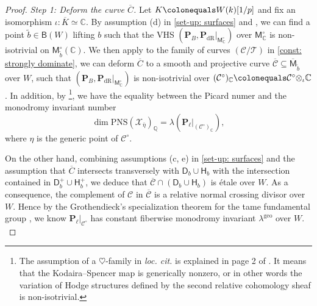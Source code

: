 \documentclass[11pt, letterpaper]{amsart}
\theoremstyle{plain}
\theoremstyle{definition}
\newcommand{\IC}{\mathbb{C}}
\newcommand{\IQ}{\mathbb{Q}}
\newcommand{\sC}{\mathcal{C}}
\newcommand\tensor{{\otimes}}
\newcommand{\<}{\langle}
\renewcommand{\>}{\rangle}
\def\wt{\widetilde}
\newcommand{\sfD}{\mathsf{D}}
\newcommand{\sfM}{\mathsf{M}}
\newcommand{\sX}{\mathcal{X}}
\newcommand{\sT}{\mathcal{T}}
\newcommand{\PNS}{\mathrm{PNS}}
\newcommand{\sfH}{\mathsf{H}}
\newcommand{\sfB}{\mathsf{B}}
\newcommand{\bP}{\mathbf{P}}
\newcommand{\dR}{\mathrm{dR}}
\newcommand{\geo}{{\mathrm{geo}}}
\begin{document}
\begin{proof}
    \noindent \textit{Step 1: Deform the curve $\overline{C}$.} Let $K \colonequals W(k)[1/p]$ and fix an isomorphism $\iota: \overline{K} \simeq \IC$. 
		By assumption (d) in \cref{set-up: surfaces} and \cite[Lem.~6.2.1]{HYZ}, we can find a point $\wt{b} \in \sfB(W)$ lifting $b$ such that the VHS $(\bP_{B}, \bP_\dR|_{\sfM^\circ_\IC})$ over $\sfM^\circ_\IC$ is non-isotrivial on $\sfM^\circ_{\wt{b}}(\IC)$. 
		We then apply \cite[Lem.~6.2.2]{HYZ} to the family of curves $(\mathscr{C}/\sT)$ in \cref{const: strongly dominate}, we can deform $\overline{C}$ to a smooth and projective curve $\overline{\sC} \subseteq \overline{\sfM}_{\wt{b}}$ over $W$, such that $(\bP_{B}, \bP_\dR|_{\sfM^\circ_\IC})$ is non-isotrivial over $(\sC^\circ)_\IC \colonequals \sC^\circ \tensor_\iota \IC$. 
		In addition, by \cite[Prop.~5.1.4]{HYZ}
        \footnote{The assumption of a $\heartsuit$-family in \textit{loc. cit.} is explained in page 2 of \cite{HYZ}. 
        It means that the Kodaira--Spencer map is generically nonzero, or in other words the variation of Hodge structures defined by the second relative cohomology sheaf is non-isotrivial.}, we have the equality between the Picard numer and the monodromy invariant number
		\[
		\dim \PNS(\sX_{\bar{\eta}})_\IQ = \lambda(\bP_{\ell}|_{(\sC^\circ)_\IC}),
		\]
		where $\eta$ is the generic point of $\sC^\circ$. 
		
		On the other hand, combining assumptions (c, e) in \cref{set-up: surfaces} and the assumption that $\overline{C}$ intersects transversely with $\sfD_{b} \cup \sfH_b$ with the intersection contained in $\sfD^+_b \cup \sfH^+_b$, we deduce that $\overline{\sC} \cap (\sfD_b \cup \sfH_b)$ is \'etale over $W$.
		As a consequence, the complement of $\sC$ in $\overline{\sC}$ is a relative normal crossing divisor over $W$. 
		Hence by the Grothendieck's specialization theorem for the tame fundamental group \cite[Lem.~5.1.3]{HYZ}, we know $\bP_{\ell}|_{\sC^\circ}$ has constant fiberwise monodromy invariant $\lambda^{\geo}$ over $W$. \\


\end{proof}
\end{document}
